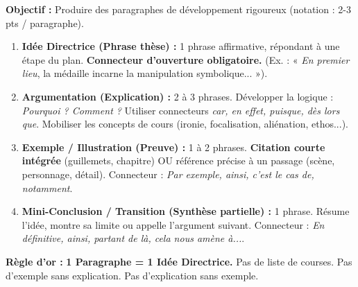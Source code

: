\documentclass[11pt]{article}
\begin{document}
\begin{methode}
\textbf{Objectif :} Produire des paragraphes de développement rigoureux (notation : 2-3 pts / paragraphe).
\begin{enumerate}
    \item \textbf{Idée Directrice (Phrase thèse) :} 1 phrase affirmative, répondant à une étape du plan. \textbf{Connecteur d'ouverture obligatoire.} (Ex. : « \emph{En premier lieu}, la médaille incarne la manipulation symbolique... »).
    \item \textbf{Argumentation (Explication) :} 2 à 3 phrases. Développer la logique : \emph{Pourquoi ? Comment ?} Utiliser connecteurs \emph{car, en effet, puisque, dès lors que}. Mobiliser les concepts de cours (ironie, focalisation, aliénation, ethos...).
    \item \textbf{Exemple / Illustration (Preuve) :} 1 à 2 phrases. \textbf{Citation courte intégrée} (guillemets, chapitre) OU référence précise à un passage (scène, personnage, détail). Connecteur : \emph{Par exemple, ainsi, c'est le cas de, notamment}.
    \item \textbf{Mini-Conclusion / Transition (Synthèse partielle) :} 1 phrase. Résume l'idée, montre sa limite ou appelle l'argument suivant. Connecteur : \emph{En définitive, ainsi, partant de là, cela nous amène à...}.
\end{enumerate}
\textbf{Règle d'or :} \textbf{1 Paragraphe = 1 Idée Directrice.} Pas de liste de courses. Pas d'exemple sans explication. Pas d'explication sans exemple.
\end{methode}
\end{document}

